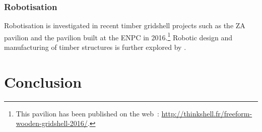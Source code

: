\subsubsection{Robotisation}
Robotisation is investigated in recent timber gridshell projects such as the ZA pavilion \cite{Mork2016} and the pavilion built at the ENPC in 2016.\footnote{This pavilion has been published on the web~: \url{http://thinkshell.fr/freeform-wooden-gridshell-2016/}.} Robotic design and manufacturing of timber structures is further explored by .

\section{Conclusion}

\clearpage




